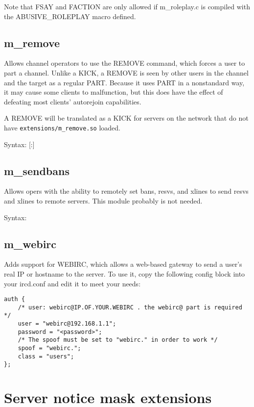 	Note that FSAY and FACTION are only allowed if m\_roleplay.c is compiled with the
	ABUSIVE\_ROLEPLAY macro defined.

\subsection{m\_remove}

	Allows channel operators to use the REMOVE command, which forces a user to part a channel.
	Unlike a KICK, a REMOVE is seen by other users in the channel and the target as a regular PART.
	Because it uses PART in a nonstandard way, it may cause some clients to malfunction, but this
	does have the effect of defeating most clients' autorejoin capabilities.

	A REMOVE will be translated as a KICK for servers on the network that do not have \nolinkurl{extensions/m\_remove.so}
	loaded.

	Syntax:    [:]

\subsection{m\_sendbans}

	Allows opers with the ability to remotely set bans, resvs, and xlines to send
	resvs and xlines to remote servers.  This module probably is not needed.

	Syntax:  

\subsection{m\_webirc}

	Adds support for WEBIRC, which allows a web-based gateway to send a user's real IP or
	hostname to the server.  To use it, copy the following config block into your ircd.conf
	and edit it to meet your needs:

\begin{verbatim}
auth {
	/* user: webirc@IP.OF.YOUR.WEBIRC . the webirc@ part is required */
	user = "webirc@192.168.1.1";
	password = "<password>";
	/* The spoof must be set to "webirc." in order to work */
	spoof = "webirc.";
	class = "users";
};
\end{verbatim}


\section{Server notice mask extensions}
\label{snoextensions}

